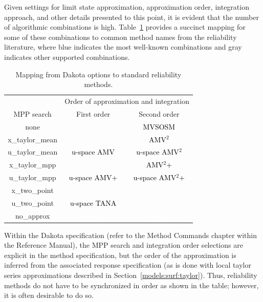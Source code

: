 Given settings for limit state approximation, approximation order,
integration approach, and other details presented to this point, it is
evident that the number of algorithmic combinations is high.
Table~\ref{tab:rel_meth_map} provides a succinct mapping for some of
these combinations to common method names from the reliability
literature, where blue indicates the most well-known combinations and
gray indicates other supported combinations.
\begin{table}
\centering
\caption{Mapping from Dakota options to standard reliability methods.}
\label{tab:rel_meth_map}
\begin{tabular}{|c|c|c|}
\hline
& \multicolumn{2}{c|}{Order of approximation and integration} \\ \cline{2-3}
MPP search      & First order & Second order                        \\ \hline
none            & \cellcolor{blue}\textcolor{white}{MVFOSM}
                & \cellcolor[gray]{0.5}\textcolor{black}{MVSOSM}   \\ \hline
x\_taylor\_mean & \cellcolor{blue}\textcolor{white}{AMV}
                & \cellcolor[gray]{0.5}\textcolor{black}{AMV$^2$}  \\ \hline
u\_taylor\_mean & \cellcolor[gray]{0.5}\textcolor{black}{u-space AMV}
                & \cellcolor[gray]{0.5}\textcolor{black}{u-space AMV$^2$} \\
\hline
x\_taylor\_mpp  & \cellcolor{blue}\textcolor{white}{AMV+}
                & \cellcolor[gray]{0.5}\textcolor{black}{AMV$^2$+} \\ \hline
u\_taylor\_mpp  & \cellcolor[gray]{0.5}\textcolor{black}{u-space AMV+}
                & \cellcolor[gray]{0.5}\textcolor{black}{u-space AMV$^2$+} \\
\hline
x\_two\_point   & \cellcolor{blue}\textcolor{white}{TANA}
                & \cellcolor[gray]{0.5}                             \\ \hline
u\_two\_point   & \cellcolor[gray]{0.5}\textcolor{black}{u-space TANA}
                & \cellcolor[gray]{0.5}                             \\ \hline
no\_approx      & \cellcolor{blue}\textcolor{white}{FORM}
                & \cellcolor{blue}\textcolor{white}{SORM}           \\ \hline
\end{tabular}
\end{table}

Within the Dakota specification (refer to the Method Commands chapter
within the Reference Manual), the MPP search and integration order
selections are explicit in the method specification, but the order of
the approximation is inferred from the associated response
specification (as is done with local taylor series approximations
described in Section~\ref{models:surf:taylor}). Thus, reliability
methods do not have to be synchronized in order as shown in the table;
however, it is often desirable to do so.


